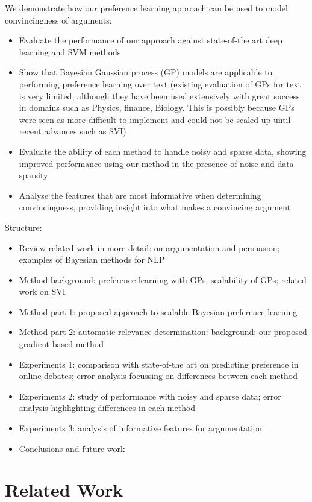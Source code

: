 We demonstrate how our preference learning approach can be used to model convincingness of arguments:
\begin{itemize}
  \item Evaluate the performance of our approach against state-of-the art deep learning and SVM methods
  \item Show that Bayesian Gaussian process (GP) models are applicable to performing preference learning over text (existing evaluation of GPs for text is very limited, although they have been used extensively with great success in domains such as Physics, finance, Biology. This is possibly because GPs were seen as more difficult to implement and could not be scaled up until recent advances such as SVI)
  \item Evaluate the ability of each method to handle noisy and sparse data, showing improved performance using our method in the presence of noise and data sparsity
  \item Analyse the features that are most informative when determining convincingness, providing insight into what makes a convincing argument
\end{itemize}

Structure:
\begin{itemize}
  \item Review related work in more detail: on argumentation and persuasion; examples of Bayesian methods for NLP
  \item Method background: preference learning with GPs; scalability of GPs; related work on SVI
  \item Method part 1: proposed approach to scalable Bayesian preference learning
  \item Method part 2: automatic relevance determination: background; our proposed gradient-based method
  \item Experiments 1: comparison with state-of-the art on predicting preference in online debates; error analysis focussing on differences between each method
  \item Experiments 2: study of performance with noisy and sparse data; error analysis highlighting differences in each method
  \item Experiments 3: analysis of informative features for argumentation
  \item Conclusions and future work
\end{itemize}

\section{Related Work}\label{sec:related}

